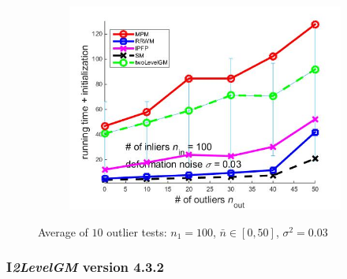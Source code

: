 \documentclass[
	fontsize=12pt,
	paper=a4,
	twoside=false,
	numbers=noenddot,
	plainheadsepline,
	toc=listof,
	toc=bibliography
]{scrartcl}
\begin{document}
\begin{figure}[h]
\begin{subfigure}[b]{0.3\textwidth}
		\includegraphics[scale=0.25]{"fig_ver2608/syntheticPointSets/ver4.3.1/outliertest_n50/time_summary_avg10t"} 
	\end{subfigure} 	
	\caption{Average of $10$ outlier tests: $n_1=100$, $\bar{n}\in[0,50]$, $\sigma^2=0.03$}
	\label{fig:test3_ver431}
\end{figure}

\FloatBarrier

\subsubsection{I\emph{2LevelGM} version 4.3.2}
\end{document}
